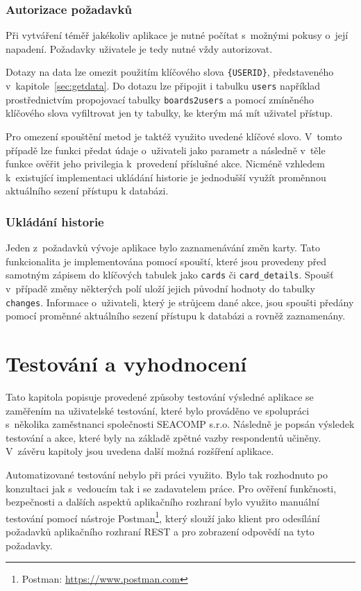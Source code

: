 \subsection{Autorizace požadavků}
Při vytváření téměř jakékoliv aplikace je nutné počítat s~možnými pokusy o~její napadení. Požadavky uživatele je tedy nutné vždy autorizovat. 

Dotazy na data lze omezit použitím klíčového slova \texttt{\{USERID\}}, představeného v~kapitole~\ref{sec:getdata}. Do dotazu lze připojit i tabulku \texttt{users} například prostřednictvím propojovací tabulky \texttt{boards2users} a pomocí zmíněného klíčového slova vyfiltrovat jen ty tabulky, ke kterým má mít uživatel přístup.

Pro omezení spouštění metod je taktéž využito uvedené klíčové slovo. V~tomto případě lze funkci předat údaje o~uživateli jako parametr a následně v~těle funkce ověřit jeho privilegia k~provedení příslušné akce. Nicméně vzhledem k~existující implementaci ukládání historie je jednodušší využít proměnnou aktuálního sezení přístupu k databázi.


\subsection{Ukládání historie}
Jeden z~požadavků vývoje aplikace bylo zaznamenávání změn karty. Tato funkcionalita je implementována pomocí spouští, které jsou provedeny před samotným zápisem do klíčových tabulek jako \texttt{cards} či \texttt{card\_details}. Spoušť v~případě změny některých polí uloží jejich původní hodnoty do tabulky \texttt{changes}. Informace o~uživateli, který je strůjcem dané akce, jsou spoušti předány pomocí proměnné aktuálního sezení přístupu k databázi a rovněž zaznamenány.


\chapter{Testování a vyhodnocení}
Tato kapitola popisuje provedené způsoby testování výsledné aplikace se zaměřením na uživatelské testování, které bylo prováděno ve spolupráci s~několika zaměstnanci společnosti SEACOMP s.r.o. Následně je popsán výsledek testování a akce, které byly na základě zpětné vazby respondentů učiněny. V~závěru kapitoly jsou uvedena další možná rozšíření aplikace.

Automatizované testování nebylo při práci využito. Bylo tak rozhodnuto po konzultaci jak s~vedoucím tak i se zadavatelem práce. Pro ověření funkčnosti, bezpečnosti a dalších aspektů aplikačního rozhraní bylo využito manuální testování pomocí nástroje Postman\footnote{Postman: \url{https://www.postman.com}}, který slouží jako klient pro odesílání požadavků aplikačního rozhraní REST a pro zobrazení odpovědí na tyto požadavky.

